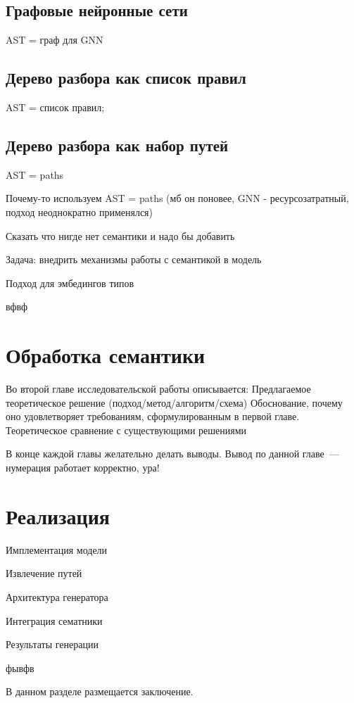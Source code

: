 \documentclass[times,specification,annotation]{itmo-student-thesis}
\begin{document}
\section{Графовые нейронные сети}\label{sec:gnn}
AST = граф для GNN

\section{Дерево разбора как список правил}\label{sec:treegen}
AST = список правил;

\section{Дерево разбора как набор путей}\label{sec:slm}
AST = paths

Почему-то используем AST = paths (мб он поновее, GNN - ресурсозатратный, подход неоднократно применялся)

Сказать что нигде нет семантики и надо бы добавить

Задача: внедрить механизмы работы с семантикой в модель

Подход для эмбедингов типов

\chapterconclusion
вфвф


\chapter{Обработка семантики}

Во второй главе исследовательской работы описывается:
Предлагаемое теоретическое решение (подход/метод/алгоритм/схема)
Обоснование, почему оно удовлетворяет требованиям, сформулированным в первой главе.
Теоретическое сравнение с существующими решениями

\chapterconclusion

В конце каждой главы желательно делать выводы. Вывод по данной главе~--- нумерация работает корректно, ура!


\chapter{Реализация}
Имплементация модели

Извлечение путей

Архитектура генератора

Интеграция сематники

Результаты генерации

\chapterconclusion
фывфв


\startconclusionpage

В данном разделе размещается заключение.

\printmainbibliography
\end{document}
